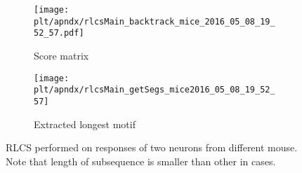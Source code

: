 \documentclass[MTech]{iitmdiss}
\newcommand{\plt}{thesis_plots}
\begin{document}
\begin{figure}[h]
  \begin{subfigure}[b]{0.5\textwidth}
    \texttt{[image: \\plt/apndx/rlcsMain\_backtrack\_mice\_2016\_05\_08\_19\_52\_57.pdf]}
    \caption{Score matrix}
  \end{subfigure}%
  \begin{subfigure}[b]{0.5\textwidth}
    \texttt{[image: \\plt/apndx/rlcsMain\_getSegs\_mice2016\_05\_08\_19\_52\_57]}
    \caption{Extracted longest motif}
  \end{subfigure}%
  \caption{RLCS performed on responses of two neurons from different mouse. Note that length of subsequence is smaller than other in cases.}
  \label{fig:}
\end{figure}
\pagebreak
\begin{singlespace}
  \begin{small}
	
  \end{small}
\end{singlespace}
\end{document}

